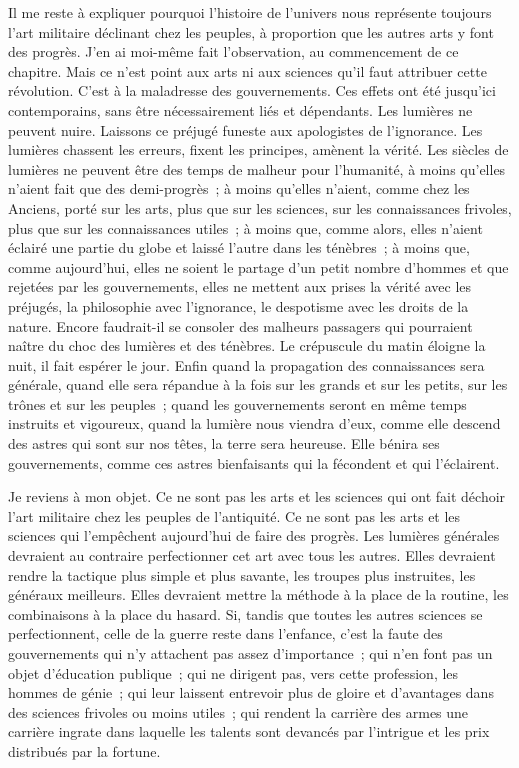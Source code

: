 \documentclass[french,twoside]{book} %
\begin{document}
Il me reste à expliquer pourquoi l’histoire de l’univers nous représente toujours l’art militaire déclinant chez les peuples, à proportion que les autres arts y font des progrès. J’en ai moi-même fait l’observation, au commencement de ce chapitre. Mais ce n’est point aux arts ni aux sciences qu’il faut attribuer cette révolution. C’est à la maladresse des gouvernements. Ces effets ont été jusqu’ici contemporains, sans être nécessairement liés et dépendants. Les lumières ne peuvent nuire. Laissons ce préjugé funeste aux apologistes de l’ignorance. Les lumières chassent les erreurs, fixent les principes, amènent la vérité. Les siècles de lumières ne peuvent être des temps de malheur pour l’humanité, à moins qu’elles n’aient fait que des demi-progrès ; à moins qu’elles n’aient, comme chez les Anciens, porté sur les arts, plus que sur les sciences, sur les connaissances frivoles, plus que sur les connaissances utiles ; à moins que, comme alors, elles n’aient éclairé une partie du globe et laissé l’autre dans les ténèbres ; à moins que, comme aujourd’hui, elles ne soient le partage d’un petit nombre d’hommes et que rejetées par les gouvernements, elles ne mettent aux prises la vérité avec les préjugés, la philosophie avec l’ignorance, le despotisme avec les droits de la nature. Encore faudrait-il se consoler des malheurs passagers qui pourraient naître du choc des lumières et des ténèbres. Le crépuscule du matin éloigne la nuit, il fait espérer le jour. Enfin quand la propagation des connaissances sera générale, quand elle sera répandue à la fois sur les grands et sur les petits, sur les trônes et sur les peuples ; quand les gouvernements seront en même temps instruits et vigoureux, quand la lumière nous viendra d’eux, comme elle descend des astres qui sont sur nos têtes, la terre sera heureuse. Elle bénira ses gouvernements, comme ces astres bienfaisants qui la fécondent et qui l’éclairent.\par
Je reviens à mon objet. Ce ne sont pas les arts et les sciences qui ont fait déchoir l’art militaire chez les peuples de l’antiquité. Ce ne sont pas les arts et les sciences qui l’empêchent aujourd’hui de faire des progrès. Les lumières générales devraient au contraire perfectionner cet art avec tous les autres. Elles devraient rendre la tactique plus simple et plus savante, les troupes plus instruites, les généraux meilleurs. Elles devraient mettre la méthode à la place de la routine, les combinaisons à la place du hasard. Si, tandis que toutes les autres sciences se perfectionnent, celle de la guerre reste dans l’enfance, c’est la faute des gouvernements qui n’y attachent pas assez d’importance ; qui n’en font pas un objet d’éducation publique ; qui ne dirigent pas, vers cette profession, les hommes de génie ; qui leur laissent entrevoir plus de gloire et d’avantages dans des sciences frivoles ou moins utiles ; qui rendent la carrière des armes une carrière ingrate dans laquelle les talents sont devancés par l’intrigue et les prix distribués par la fortune.\par
\end{document}
